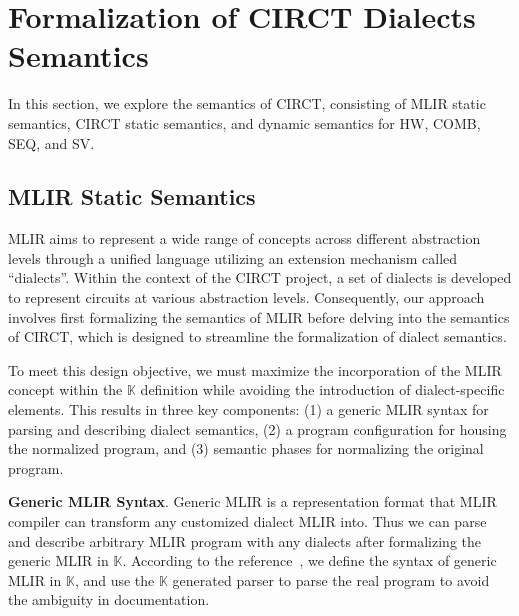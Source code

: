 
\section{Formalization of CIRCT Dialects Semantics}\label{sec:semantics-formalization}

In this section, we explore the semantics of CIRCT, consisting of MLIR static semantics, CIRCT static semantics, and dynamic semantics for HW, COMB, SEQ, and SV. 

\subsection{MLIR Static Semantics}\label{sec:mlir-static-semantics}

MLIR aims to represent a wide range of concepts across different abstraction levels through a unified language utilizing an extension mechanism called ``dialects''. Within the context of the CIRCT project, a set of dialects is developed to represent circuits at various abstraction levels. Consequently, our approach involves first formalizing the semantics of MLIR before delving into the semantics of CIRCT, which is designed to streamline the formalization of dialect semantics.

To meet this design objective, we must maximize the incorporation of the MLIR concept within the $\mathbb{K}$ definition while avoiding the introduction of dialect-specific elements. This results in three key components: (1) a generic MLIR syntax for parsing and describing dialect semantics, (2) a program configuration for housing the normalized program, and  (3) semantic phases for normalizing the original program.

\smallskip
\textbf{Generic MLIR Syntax}. Generic MLIR is a representation format that MLIR compiler can transform any customized dialect MLIR into. Thus we can parse and describe arbitrary MLIR program with any dialects after formalizing the generic MLIR in $\mathbb{K}$. According to the reference~, we define the syntax of generic MLIR in $\mathbb{K}$, and use the $\mathbb{K}$ generated parser to parse the real program to avoid the ambiguity in documentation.  

